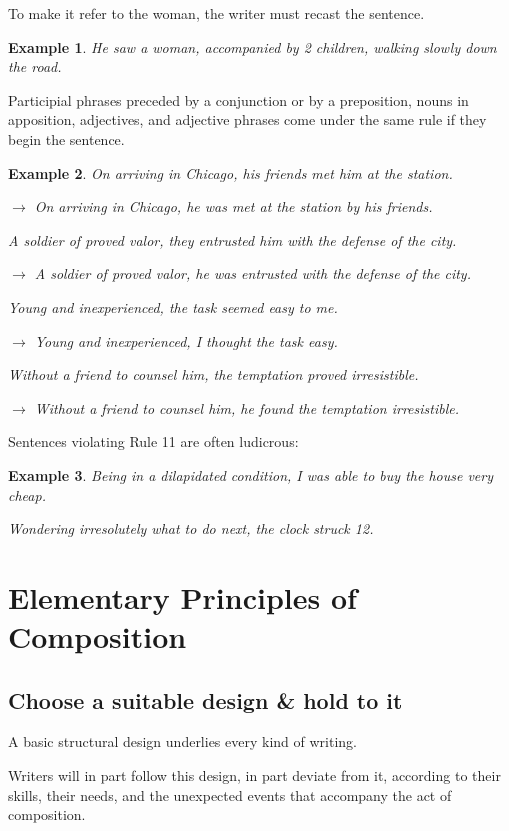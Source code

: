 \documentclass{book}
\numberwithin{equation}{section}
\newtheorem{example}{Example}[chapter]
\begin{document}
To make it refer to the woman, the writer must recast the sentence.
\begin{example}
    He saw a woman, accompanied by 2 children, walking slowly down the road.
\end{example}
Participial phrases preceded by a conjunction or by a preposition, nouns in apposition, adjectives, and adjective phrases come under the same rule if they begin the sentence.
\begin{example}
    On arriving in Chicago, his friends met him at the station.
    
    $\to$ On arriving in Chicago, he was met at the station by his friends.
    
    A soldier of proved valor, they entrusted him with the defense of the city.
    
    $\to$ A soldier of proved valor, he was entrusted with the defense of the city.
    
    Young and inexperienced, the task seemed easy to me.
    
    $\to$ Young and inexperienced, I thought the task easy.
    
    Without a friend to counsel him, the temptation proved irresistible.
    
    $\to$ Without a friend to counsel him, he found the temptation irresistible.
\end{example}
Sentences violating Rule 11 are often ludicrous:
\begin{example}
    Being in a dilapidated condition, I was able to buy the house very cheap.
    
    Wondering irresolutely what to do next, the clock struck 12.
\end{example}


\chapter{Elementary Principles of Composition}

\section{Choose a suitable design \& hold to it}
A basic structural design underlies every kind of writing.

Writers will in part follow this design, in part deviate from it, according to their skills, their needs, and the unexpected events that accompany the act of composition.
\end{document}
